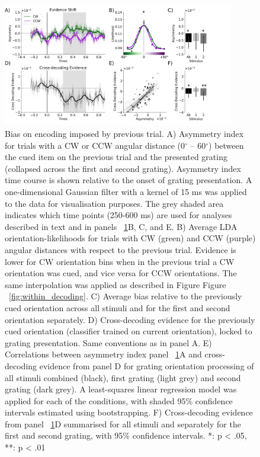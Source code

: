 \documentclass{article}
\begin{document}
\begin{large}
\begin{figure}[!htb]
\centering\includegraphics[width=0.9\textwidth]{figures/figure6_between_trial_decoding} 
\caption[Bias on encoding imposed by previous trial.]{Bias on encoding imposed by previous trial. A) Asymmetry index for trials with a CW or CCW angular distance (0$^{\circ}$ – 60$^{\circ}$) between the cued item on the previous trial and the presented grating (collapsed across the first and second grating). Asymmetry index time course is shown relative to the onset of grating presentation. A one-dimensional Gaussian filter with a kernel of 15 ms was applied to the data for visualisation purposes. The grey shaded area indicates which time points (250-600 ms) are used for analyses described in text and in panels ~\ref{fig:between_decoding}B, C, and E. B) Average LDA orientation-likelihoods for trials with CW (green) and CCW (purple) angular distances with respect to the previous trial. Evidence is lower for CW orientation bins when in the previous trial a CW orientation was cued, and vice versa for CCW orientations. The same interpolation was applied as described in Figure Figure ~\ref{fig:within_decoding}. C) Average bias relative to the previously cued orientation across all stimuli and for the first and second orientation separately. D) Cross-decoding evidence for the previously cued orientation (classifier trained on current orientation), locked to grating presentation. Same conventions as in panel A. E) Correlations between asymmetry index panel ~\ref{fig:between_decoding}A and cross-decoding evidence from panel D for grating orientation processing of all stimuli combined (black), first grating (light grey) and second grating (dark grey). A least-squares linear regression model was applied for each of the conditions, with shaded 95\% confidence intervals estimated using bootstrapping. F) Cross-decoding evidence from panel ~\ref{fig:between_decoding}D summarised for all stimuli and separately for the first and second grating, with 95\% confidence intervals. *: p < .05, **: p < .01}
\label{fig:between_decoding}\end{figure}


\end{large}
\end{document}
